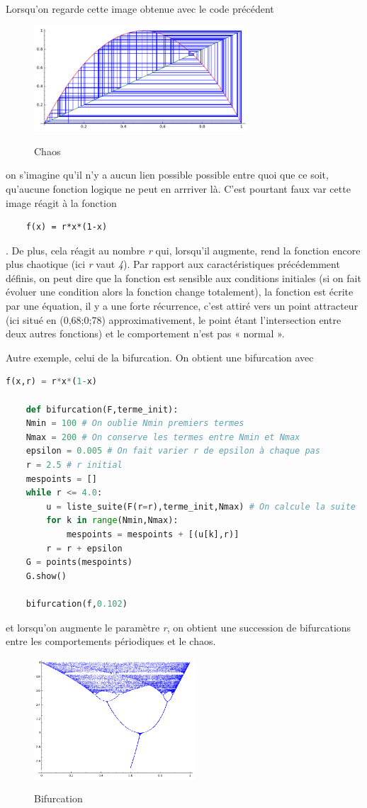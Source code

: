\documentclass[french,11pt]{report}
\begin{document}
Lorsqu'on regarde cette image obtenue avec le code précédent 
\begin{figure} [!h]
    \centering
    \includegraphics[width=8cm]{chaos}
    \label{fig:chaos}
    \caption{Chaos}
\end{figure}

on s'imagine qu'il n'y a aucun lien possible possible entre quoi que ce soit, qu'aucune fonction logique ne peut en arrriver là. C'est pourtant faux var cette image réagit à la fonction 
\begin{lstlisting}
    f(x) = r*x*(1-x)
\end{lstlisting}
. De plus, cela réagit au nombre \textit{r} qui, lorsqu'il augmente, rend la fonction encore plus chaotique (ici \textit{r} vaut \textit{4}).
Par rapport aux caractéristiques précédemment définis, on peut dire que la fonction est sensible aux conditions initiales (si on fait évoluer une condition alors la fonction change totalement), la fonction est écrite par une équation, il y a une forte récurrence, c’est attiré vers un point attracteur (ici situé en (0,68;0;78) approximativement, le point étant l'intersection entre deux autres fonctions) et le comportement n’est pas « normal ».


Autre exemple, celui de la bifurcation. On obtient une bifurcation avec 
\begin{lstlisting}[language = python]
    f(x,r) = r*x*(1-x)
    
    def bifurcation(F,terme_init):
    Nmin = 100 # On oublie Nmin premiers termes
    Nmax = 200 # On conserve les termes entre Nmin et Nmax
    epsilon = 0.005 # On fait varier r de epsilon à chaque pas
    r = 2.5 # r initial
    mespoints = []
    while r <= 4.0:
        u = liste_suite(F(r=r),terme_init,Nmax) # On calcule la suite
        for k in range(Nmin,Nmax):
            mespoints = mespoints + [(u[k],r)]
        r = r + epsilon
    G = points(mespoints)
    G.show()
    
    bifurcation(f,0.102)
\end{lstlisting}
et lorsqu’on augmente le paramètre \textit{r}, on obtient une succession de bifurcations entre les comportements périodiques et le chaos.
\begin{figure} [!h]
    \centering
    \includegraphics[width=6cm]{bifurcation}
    \label{fig:bifurcation}
    \caption{Bifurcation}
\end{figure}
\end{document}
